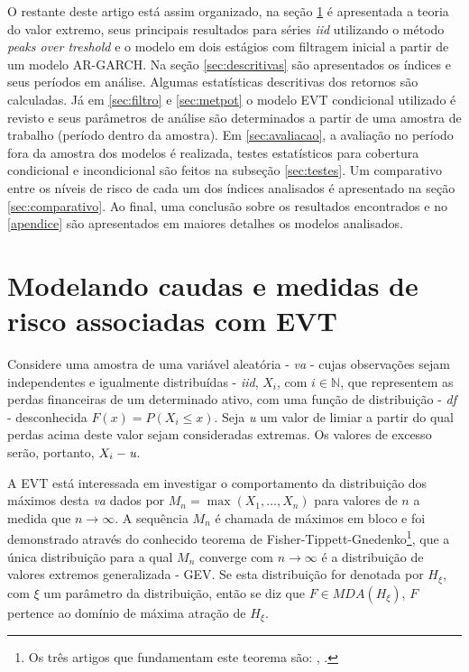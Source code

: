 \documentclass[1p]{elsarticle}
\theoremstyle{definition}
\begin{document}
O restante deste artigo está assim organizado, na seção \ref{sec:caudas} é apresentada a teoria do valor extremo, seus principais resultados para séries \emph{iid} utilizando o método \emph{peaks over treshold} e o modelo em dois estágios com filtragem inicial a partir de um modelo AR-GARCH. Na seção \ref{sec:descritivas} são apresentados os índices e seus períodos em análise. Algumas estatísticas descritivas dos retornos são calculadas. Já em \ref{sec:filtro} e \ref{sec:metpot} o modelo EVT condicional utilizado é revisto e seus parâmetros de análise são determinados a partir de uma amostra de trabalho (período dentro da amostra). Em \ref{sec:avaliacao}, a avaliação no período fora da amostra dos modelos é realizada, testes estatísticos para cobertura condicional e incondicional são feitos na subseção \ref{sec:testes}. Um comparativo entre os níveis de risco de cada um dos índices analisados é apresentado na seção \ref{sec:comparativo}. Ao final, uma conclusão sobre os resultados encontrados e no \ref{apendice} são apresentados em maiores detalhes os modelos analisados.

\section{Modelando caudas e medidas de risco associadas com EVT}
\label{sec:caudas}

Considere uma amostra de uma variável aleatória - \emph{va} - cujas observações sejam independentes e igualmente distribuídas - \emph{iid}, $X_i$, com $i\in \mathbb{N}$, que representem as perdas financeiras de um determinado ativo, com uma função de distribuição - \emph{df} - desconhecida $F(x) = P(X_i \leq x)$.
Seja \emph{u} um valor de limiar a partir do qual perdas acima deste valor sejam consideradas extremas. Os valores de excesso serão, portanto, $X_i - \emph{u}$.

A EVT está interessada em investigar o comportamento da distribuição dos máximos desta \emph{va} dados por $M_n = \max (X_1, \ldots , X_n)$ para valores de $n$ a medida que $n\rightarrow \infty$. A sequência $M_n$ é chamada de máximos em bloco e foi demonstrado através do conhecido teorema de Fisher-Tippett-Gnedenko\footnote{Os três artigos que fundamentam este teorema são: \cite{Fisher1928}, \cite{Gnedenko1941, Gnedenko1943}.}, que a única distribuição para a qual $M_n$ converge com $n\rightarrow \infty$ é a distribuição de valores extremos generalizada - GEV. Se esta distribuição for denotada por $H_\xi$, com $\xi$ um parâmetro da distribuição, então se diz que $F \in MDA(H_\xi)$, $F$ pertence ao domínio de máxima atração de $H_\xi$.
\end{document}
